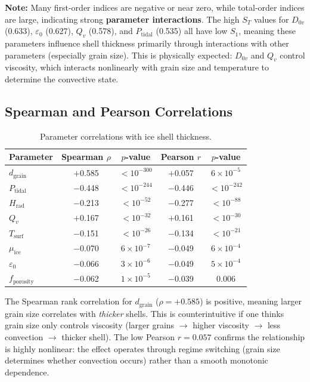 \documentclass[11pt,letterpaper]{article}
\begin{document}
\textbf{Note:} Many first-order indices are negative or near zero, while total-order indices are large, indicating strong \textbf{parameter interactions}. The high $S_T$ values for $D_{0v}$ (0.633), $\varepsilon_0$ (0.627), $Q_v$ (0.578), and $P_\mathrm{tidal}$ (0.535) all have low $S_1$, meaning these parameters influence shell thickness primarily through interactions with other parameters (especially grain size). This is physically expected: $D_{0v}$ and $Q_v$ control viscosity, which interacts nonlinearly with grain size and temperature to determine the convective state.

\subsection{Spearman and Pearson Correlations}

\begin{longtable}{@{}lcccc@{}}
\caption{Parameter correlations with ice shell thickness.}
\label{tab:correlations} \\
\toprule
\textbf{Parameter} & \textbf{Spearman $\rho$} & \textbf{$p$-value} & \textbf{Pearson $r$} & \textbf{$p$-value} \\
\midrule
\endfirsthead
$d_\mathrm{grain}$ & $+$0.585 & $< 10^{-300}$ & $+$0.057 & $6 \times 10^{-5}$ \\
$P_\mathrm{tidal}$ & $-$0.448 & $< 10^{-244}$ & $-$0.446 & $< 10^{-242}$ \\
$H_\mathrm{rad}$ & $-$0.213 & $< 10^{-52}$ & $-$0.277 & $< 10^{-88}$ \\
$Q_v$ & $+$0.167 & $< 10^{-32}$ & $+$0.161 & $< 10^{-30}$ \\
$T_\mathrm{surf}$ & $-$0.151 & $< 10^{-26}$ & $-$0.134 & $< 10^{-21}$ \\
$\mu_\mathrm{ice}$ & $-$0.070 & $6 \times 10^{-7}$ & $-$0.049 & $6 \times 10^{-4}$ \\
$\varepsilon_0$ & $-$0.066 & $3 \times 10^{-6}$ & $-$0.049 & $5 \times 10^{-4}$ \\
$f_\mathrm{porosity}$ & $-$0.062 & $1 \times 10^{-5}$ & $-$0.039 & $0.006$ \\
\bottomrule
\end{longtable}

The Spearman rank correlation for $d_\mathrm{grain}$ ($\rho = +0.585$) is positive, meaning larger grain size correlates with \textit{thicker} shells. This is counterintuitive if one thinks grain size only controls viscosity (larger grains $\rightarrow$ higher viscosity $\rightarrow$ less convection $\rightarrow$ thicker shell). The low Pearson $r = 0.057$ confirms the relationship is highly nonlinear: the effect operates through regime switching (grain size determines whether convection occurs) rather than a smooth monotonic dependence.
\end{document}
